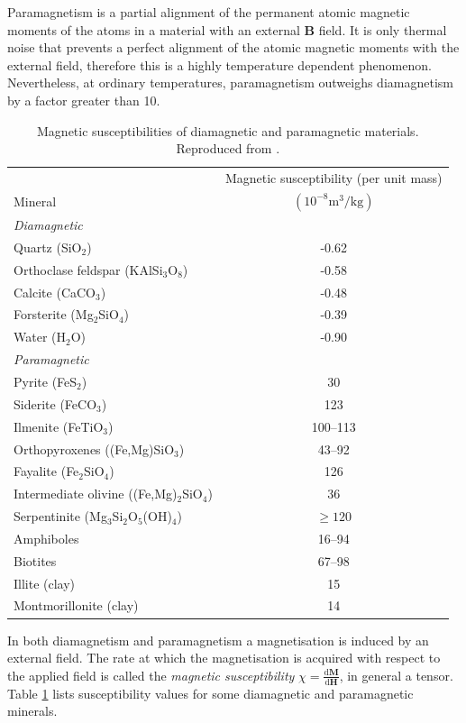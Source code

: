 Paramagnetism is a partial alignment of the permanent atomic magnetic moments of the atoms in a material with an external $\boldsymbol{B}$ field. It is only thermal noise that prevents a perfect alignment of the atomic magnetic moments with the external field, therefore this is a highly temperature dependent phenomenon. Nevertheless, at ordinary temperatures, paramagnetism outweighs diamagnetism by a factor greater than 10.
\begin{table}
\begin{tabular}{l c}
\hline
\hline
  & Magnetic susceptibility (per unit mass) \\ \cline{2-2}
Mineral & $(10^{-8} \mathrm{m}^{3}/\mathrm{kg})$ \\ \hline
\textit{Diamagnetic} & \\
Quartz (SiO$_2$) & -0.62 \\
Orthoclase feldspar (KAlSi$_3$O$_8$) & -0.58 \\
Calcite (CaCO$_3$) & -0.48 \\
Forsterite (Mg$_2$SiO$_4$) & -0.39 \\
Water (H$_2$O) & -0.90 \\
\textit{Paramagnetic} & \\
Pyrite (FeS$_2$) & 30 \\
Siderite (FeCO$_3$) & 123 \\
Ilmenite (FeTiO$_3$) & 100--113 \\
Orthopyroxenes ((Fe,Mg)SiO$_3$) & 43--92 \\
Fayalite (Fe$_2$SiO$_4$) & 126 \\
Intermediate olivine ((Fe,Mg)$_2$SiO$_4$) & 36 \\
Serpentinite (Mg$_3$Si$_2$O$_5$(OH)$_4$) & $\geq 120$ \\
Amphiboles & 16--94 \\
Biotites & 67--98 \\
Illite (clay) & 15 \\
Montmorillonite (clay) & 14 \\
\hline
\hline
\end{tabular}
\caption[Magnetic susceptibilities of diamagnetic and paramagnetic materials]{Magnetic susceptibilities of diamagnetic and paramagnetic materials. Reproduced from \citet{Dunlop}.}
\label{Susc}
\end{table}\par

In both diamagnetism and paramagnetism a magnetisation is induced by an external field. The rate at which the magnetisation is acquired with respect to the applied field is called the \textit{magnetic susceptibility} $\chi = \frac{\text{d}\boldsymbol{M}}{\text{d}\boldsymbol{H}}$, in general a tensor. Table \ref{Susc} lists susceptibility values for some diamagnetic and paramagnetic minerals.\par

